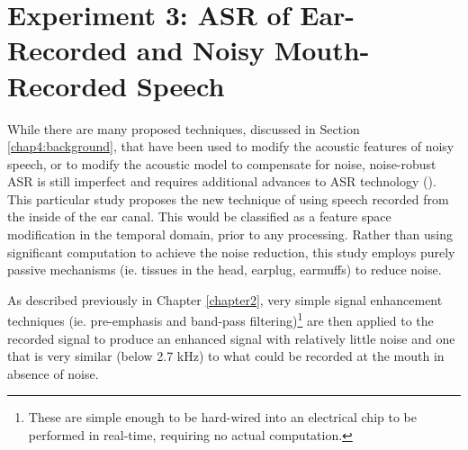 % 
% 
% 
% 
% 





\section{Experiment 3: ASR of Ear-Recorded and Noisy Mouth-Recorded Speech}\label{expt3}

While there are many proposed techniques, discussed in Section \ref{chap4:background}, that have been used to modify the acoustic features of noisy speech, or to modify the acoustic model to compensate for noise, noise-robust ASR is still imperfect and requires additional advances to ASR technology (\cite{zhang:17}).  This particular study proposes the new technique of using speech recorded from the inside of the ear canal.  This would be classified as a feature space modification in the temporal domain, prior to any processing.  Rather than using significant computation to achieve the noise reduction, this study employs purely passive mechanisms (ie. tissues in the head, earplug, earmuffs) to reduce noise.  

As described previously in Chapter \ref{chapter2}, very simple signal enhancement techniques (ie. pre-emphasis and band-pass filtering)\footnote{These are simple enough to be hard-wired into an electrical chip to be performed in real-time, requiring no actual computation.} are then applied to the recorded signal to produce an enhanced signal with relatively little noise and one that is very similar (below 2.7 kHz) to what could be recorded at the mouth in absence of noise.


